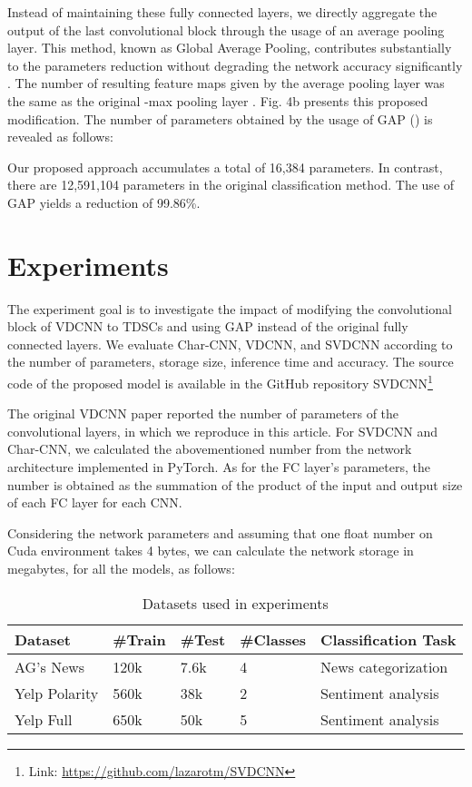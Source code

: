 \documentclass[conference]{IEEEtran}
\newcommand{\ra}[1]{\renewcommand{\arraystretch}{#1}}
\begin{document}
Instead of maintaining these fully connected layers, we directly aggregate the output of the last convolutional block through the usage of an average pooling layer. This method, known as Global Average Pooling, contributes substantially to the parameters reduction without degrading the network accuracy significantly \cite{lin2013network}. The number of resulting feature maps given by the average pooling layer was the same as the original -max pooling layer .  Fig. 4b presents this proposed modification. The number of parameters obtained by the usage of GAP () is revealed as follows:



Our proposed approach accumulates a total of 16,384 parameters. In contrast, there are 12,591,104 parameters in the original classification method. The use of GAP yields a reduction of 99.86\%.
 
\section{Experiments}

The experiment goal is to investigate the impact of modifying the convolutional block of VDCNN to TDSCs and using GAP instead of the original fully connected layers. We evaluate Char-CNN, VDCNN, and SVDCNN according to the number of parameters, storage size, inference time and accuracy. The source code of the proposed model is available in the GitHub repository SVDCNN\footnote[1]{Link: \url{https://github.com/lazarotm/SVDCNN}}

The original VDCNN paper reported the number of parameters of the convolutional layers, in which we reproduce in this article. For SVDCNN and Char-CNN, we calculated the abovementioned number from the network architecture implemented in PyTorch. As for the FC layer's parameters, the number is obtained as the summation of the product of the input and output size of each FC layer for each CNN.







Considering the network parameters  and assuming that one float number on Cuda environment takes 4 bytes, we can calculate the network storage in megabytes, for all the models, as follows:



\begin{table}[htpb]
\caption{Datasets used in experiments}
\ra{1.3}
\begin{center}
\begin{tabular}{@{}lllll@{}}\toprule
Dataset          & \#Train & \#Test & \#Classes & Classification Task  \\  \midrule
AG's News        & 120k  & 7.6k   & 4   & News categorization \\
Yelp Polarity & 560k & 38k  & 2  & Sentiment analysis  \\
Yelp Full & 650k & 50k  & 5  & Sentiment analysis  \\
\bottomrule
\end{tabular}
\end{center}
\label{datasets}
\end{table}
\end{document}
